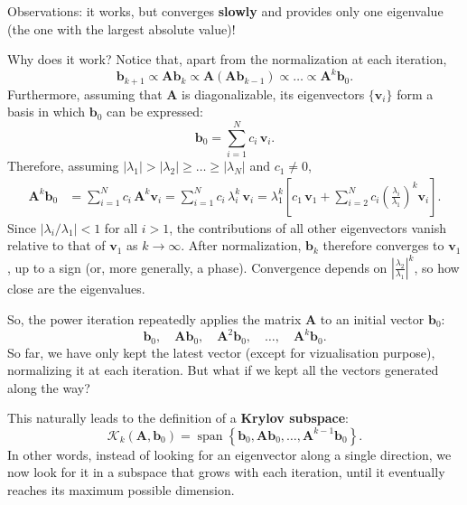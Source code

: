 \documentclass[10pt,aspectratio=169]{beamer}
\begin{document}
\begin{frame}
	Observations: it works, but converges \textbf{slowly} and provides only one eigenvalue (the one with the largest absolute value)!
	
	\medskip
	Why does it work? Notice that, apart from the normalization at each iteration,
	\begin{equation*}
		\mathbf b_{k+1}\propto \mathbf A\mathbf b_k \propto \mathbf A(\mathbf A\mathbf b_{k-1}) \propto \ldots \propto \mathbf A^k\mathbf b_0.
	\end{equation*}
	 \pause
	Furthermore, assuming that $\mathbf A$ is diagonalizable, its eigenvectors $\{\mathbf v_i\}$ form a basis in which $\mathbf b_0$ can be expressed:
	\begin{equation*}
		\mathbf b_0 = \sum_{i=1}^N c_i\,\mathbf v_i.
	\end{equation*}
	Therefore, assuming $|\lambda_1|>|\lambda_2|\geq\ldots\geq|\lambda_N|$ and $c_1\neq 0$,
	\begin{align*}
		\mathbf A^k \mathbf b_0 &= \sum_{i=1}^N c_i\,\mathbf A^k\mathbf v_i = \sum_{i=1}^N c_i\,\lambda_i^k\,\mathbf v_i= \lambda_1^k\left[c_1\,\mathbf v_1 + \sum_{i=2}^N c_i\left(\frac{\lambda_i}{\lambda_1}\right)^k\mathbf v_i\right].
	\end{align*}
	Since $|\lambda_i/\lambda_1|<1$ for all $i>1$, the contributions of all other eigenvectors vanish relative to that of $\mathbf v_1$ as $k\rightarrow\infty$. After normalization, $\mathbf b_k$ therefore converges to $\mathbf v_1$, up to a sign (or, more generally, a phase).
	Convergence depends on $\left|\frac{\lambda_2}{\lambda_1}\right|^k$, so how close are the eigenvalues.
\end{frame}

\begin{frame}
	So, the power iteration repeatedly applies the matrix $\mathbf A$ to an initial vector $\mathbf b_0$:
	\begin{equation*}
		\mathbf b_0,\quad \mathbf A\mathbf b_0,\quad \mathbf A^2\mathbf b_0,\quad \ldots,\quad \mathbf A^k\mathbf b_0.
	\end{equation*}
	So far, we have only kept the latest vector (except for vizualisation purpose), normalizing it at each iteration. But what if we kept all the vectors generated along the way?
	
	\medskip
	This naturally leads to the definition of a \textbf{Krylov subspace}:
	\begin{equation*}
		\boxed{\mathcal K_k(\mathbf A,\mathbf b_0)=\operatorname{span}\left\{\mathbf b_0,\mathbf A\mathbf b_0,\ldots,\mathbf A^{k-1}\mathbf b_0\right\}.}
	\end{equation*}
	In other words, instead of looking for an eigenvector along a single direction, we now look for it in a subspace that grows with each iteration, until it eventually reaches its maximum possible dimension.
\end{frame}
\end{document}
